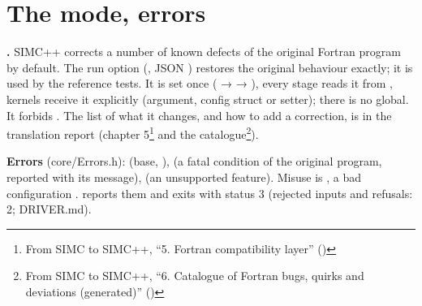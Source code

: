 \section{\texorpdfstring{The  mode, errors}{The fortran\_\allowbreak{}compat mode, errors}}\label{developer_manual-03u5farchitecture:37-the-fortranu5fcompat-mode-errors}
\textbf{.} SIMC++ corrects a number of known defects of the original Fortran program by default. The run
option  (, JSON ) restores the original
behaviour exactly; it is used by the reference tests. It is set once ( →  →
), every stage reads it from , kernels receive it explicitly (argument,
config struct or setter); there is no global. It forbids . The list of what it changes, and how to add
a correction, is in the translation report (chapter 5\footnote{From SIMC to SIMC++, ``5. Fortran compatibility layer'' ()} and the
catalogue\footnote{From SIMC to SIMC++, ``6. Catalogue of Fortran bugs, quirks and deviations (generated)'' ()}).

\textbf{Errors} (core/\allowbreak{}Errors.\allowbreak{}h):  (base, ),  (a fatal condition of the
original program, reported with its message),  (an unsupported feature). Misuse is , a
bad configuration .  reports them and exits with status 3 (rejected inputs and refusals:
2; DRIVER.md).

